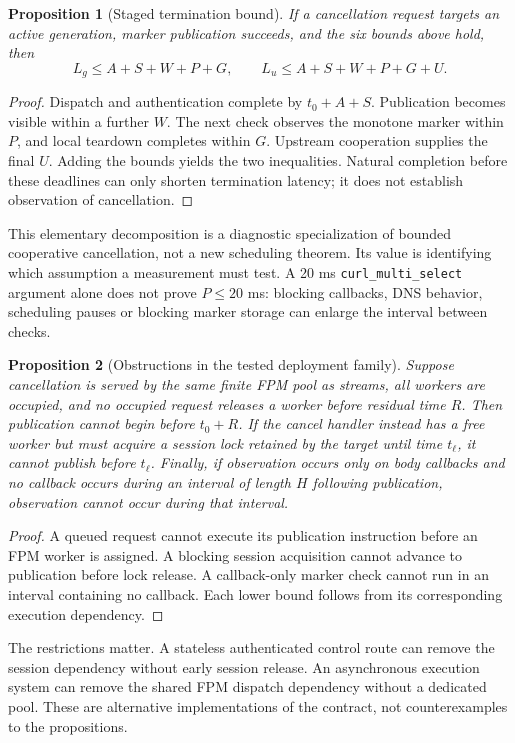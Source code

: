 \documentclass[11pt,a4paper]{article}
\newtheorem{proposition}{Proposition}
\begin{document}
\begin{proposition}[Staged termination bound]
If a cancellation request targets an active generation, marker publication succeeds, and the six bounds above hold, then
\begin{equation}
L_g\leq A+S+W+P+G,\qquad
L_u\leq A+S+W+P+G+U.
\label{eq:bound}
\end{equation}
\end{proposition}
\begin{proof}
Dispatch and authentication complete by $t_0+A+S$. Publication becomes visible within a further $W$. The next check observes the monotone marker within $P$, and local teardown completes within $G$. Upstream cooperation supplies the final $U$. Adding the bounds yields the two inequalities. Natural completion before these deadlines can only shorten termination latency; it does not establish observation of cancellation.
\end{proof}
This elementary decomposition is a diagnostic specialization of bounded cooperative cancellation, not a new scheduling theorem. Its value is identifying which assumption a measurement must test. A 20 ms \texttt{curl\_multi\_select} argument alone does not prove $P\leq20$ ms: blocking callbacks, DNS behavior, scheduling pauses or blocking marker storage can enlarge the interval between checks.

\begin{proposition}[Obstructions in the tested deployment family]
Suppose cancellation is served by the same finite FPM pool as streams, all workers are occupied, and no occupied request releases a worker before residual time $R$. Then publication cannot begin before $t_0+R$. If the cancel handler instead has a free worker but must acquire a session lock retained by the target until time $t_\ell$, it cannot publish before $t_\ell$. Finally, if observation occurs only on body callbacks and no callback occurs during an interval of length $H$ following publication, observation cannot occur during that interval.
\end{proposition}
\begin{proof}
A queued request cannot execute its publication instruction before an FPM worker is assigned. A blocking session acquisition cannot advance to publication before lock release. A callback-only marker check cannot run in an interval containing no callback. Each lower bound follows from its corresponding execution dependency.
\end{proof}
The restrictions matter. A stateless authenticated control route can remove the session dependency without early session release. An asynchronous execution system can remove the shared FPM dispatch dependency without a dedicated pool. These are alternative implementations of the contract, not counterexamples to the propositions.
\end{document}
